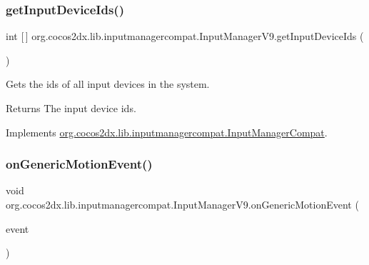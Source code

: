 \subsubsection{\texorpdfstring{get\+Input\+Device\+Ids()}{getInputDeviceIds()}\hspace{0.1cm}{\footnotesize\ttfamily [2/2]}}
{\footnotesize\ttfamily int \mbox{[}$\,$\mbox{]} org.\+cocos2dx.\+lib.\+inputmanagercompat.\+Input\+Manager\+V9.\+get\+Input\+Device\+Ids (\begin{DoxyParamCaption}{ }\end{DoxyParamCaption})\hspace{0.3cm}{\ttfamily [inline]}}

Gets the ids of all input devices in the system.

\begin{DoxyReturn}{Returns}
The input device ids. 
\end{DoxyReturn}


Implements \hyperlink{interfaceorg_1_1cocos2dx_1_1lib_1_1inputmanagercompat_1_1InputManagerCompat_a1601bfbe1b4871a935d49a2a4094e5ac}{org.\+cocos2dx.\+lib.\+inputmanagercompat.\+Input\+Manager\+Compat}.

\mbox{\label{classorg_1_1cocos2dx_1_1lib_1_1inputmanagercompat_1_1InputManagerV9_aa7e7451896e351e520f511388907fde9}} 
\subsubsection{\texorpdfstring{on\+Generic\+Motion\+Event()}{onGenericMotionEvent()}\hspace{0.1cm}{\footnotesize\ttfamily [1/2]}}
{\footnotesize\ttfamily void org.\+cocos2dx.\+lib.\+inputmanagercompat.\+Input\+Manager\+V9.\+on\+Generic\+Motion\+Event (\begin{DoxyParamCaption}\item[{Motion\+Event}]{event }\end{DoxyParamCaption})\hspace{0.3cm}{\ttfamily [inline]}}

